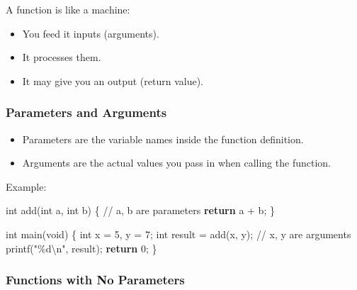\documentclass[
  letterpaper,
  DIV=11,
  numbers=noendperiod]{scrreprt}
\newenvironment{Shaded}{\begin{snugshade}}{\end{snugshade}}
\newcommand{\CommentTok}[1]{\textcolor[rgb]{0.37,0.37,0.37}{#1}}
\newcommand{\ControlFlowTok}[1]{\textcolor[rgb]{0.00,0.23,0.31}{\textbf{#1}}}
\newcommand{\DataTypeTok}[1]{\textcolor[rgb]{0.68,0.00,0.00}{#1}}
\newcommand{\DecValTok}[1]{\textcolor[rgb]{0.68,0.00,0.00}{#1}}
\newcommand{\NormalTok}[1]{\textcolor[rgb]{0.00,0.23,0.31}{#1}}
\newcommand{\OperatorTok}[1]{\textcolor[rgb]{0.37,0.37,0.37}{#1}}
\newcommand{\SpecialCharTok}[1]{\textcolor[rgb]{0.37,0.37,0.37}{#1}}
\newcommand{\StringTok}[1]{\textcolor[rgb]{0.13,0.47,0.30}{#1}}
\providecommand{\tightlist}{%
  \setlength{\itemsep}{0pt}\setlength{\parskip}{0pt}}
\begin{document}
A function is like a machine:

\begin{itemize}
\tightlist
\item
  You feed it inputs (arguments).
\item
  It processes them.
\item
  It may give you an output (return value).
\end{itemize}

\subsubsection{Parameters and Arguments}\label{parameters-and-arguments}

\begin{itemize}
\tightlist
\item
  Parameters are the variable names inside the function definition.
\item
  Arguments are the actual values you pass in when calling the function.
\end{itemize}

Example:

\begin{Shaded}
\begin{Highlighting}[]
\DataTypeTok{int}\NormalTok{ add}\OperatorTok{(}\DataTypeTok{int}\NormalTok{ a}\OperatorTok{,} \DataTypeTok{int}\NormalTok{ b}\OperatorTok{)} \OperatorTok{\{}   \CommentTok{// a, b are parameters}
    \ControlFlowTok{return}\NormalTok{ a }\OperatorTok{+}\NormalTok{ b}\OperatorTok{;}
\OperatorTok{\}}

\DataTypeTok{int}\NormalTok{ main}\OperatorTok{(}\DataTypeTok{void}\OperatorTok{)} \OperatorTok{\{}
    \DataTypeTok{int}\NormalTok{ x }\OperatorTok{=} \DecValTok{5}\OperatorTok{,}\NormalTok{ y }\OperatorTok{=} \DecValTok{7}\OperatorTok{;}
    \DataTypeTok{int}\NormalTok{ result }\OperatorTok{=}\NormalTok{ add}\OperatorTok{(}\NormalTok{x}\OperatorTok{,}\NormalTok{ y}\OperatorTok{);}  \CommentTok{// x, y are arguments}
\NormalTok{    printf}\OperatorTok{(}\StringTok{"}\SpecialCharTok{\%d\textbackslash{}n}\StringTok{"}\OperatorTok{,}\NormalTok{ result}\OperatorTok{);}
    \ControlFlowTok{return} \DecValTok{0}\OperatorTok{;}
\OperatorTok{\}}
\end{Highlighting}
\end{Shaded}

\subsubsection{Functions with No
Parameters}\label{functions-with-no-parameters}
\end{document}
